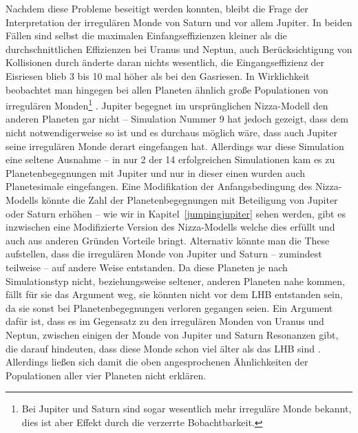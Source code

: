 \documentclass[12pt,a4paper,twoside,open=right,bibliography=totoc]{scrbook}
\renewcommand{\cite}{ \citep}
\begin{document}
Nachdem diese Probleme beseitigt werden konnten, bleibt die Frage der Interpretation der irregulären Monde von Saturn und vor allem Jupiter. In beiden Fällen sind selbst die maximalen Einfangseffizienzen kleiner als die durchschnittlichen Effizienzen bei Uranus und Neptun, auch Berücksichtigung von Kollisionen durch \cite{Bottke2010} änderte daran nichts wesentlich, die Eingangseffizienz der Eisriesen blieb 3 bis 10 mal höher als bei den Gasriesen.
In Wirklichkeit beobachtet man hingegen bei allen Planeten ähnlich große Populationen von irregulären Monden\footnote{Bei Jupiter und Saturn sind sogar wesentlich mehr irreguläre Monde bekannt, dies ist aber Effekt durch die verzerrte Bobachtbarkeit.}\cite{Nesvorny2007}. %
Jupiter begegnet im ursprünglichen Nizza-Modell den anderen Planeten gar nicht –
Simulation Nummer 9 hat jedoch gezeigt, dass dem nicht notwendigerweise so ist und es durchaus möglich wäre, dass auch Jupiter seine irregulären Monde derart eingefangen hat.
Allerdings war diese Simulation eine seltene Ausnahme – in nur 2 der 14 erfolgreichen Simulationen kam es zu Planetenbegegnungen mit Jupiter und nur in dieser einen wurden auch Planetesimale eingefangen.
Eine Modifikation der Anfangsbedingung des Nizza-Modells könnte die Zahl der Planetenbegegnungen mit Beteiligung von Jupiter oder Saturn erhöhen -- wie wir in Kapitel~\ref{jumpingjupiter} sehen werden, gibt es inzwischen eine Modifizierte Version des Nizza-Modells welche dies erfüllt und auch aus anderen Gründen Vorteile bringt.
Alternativ könnte man die These aufstellen, dass die irregulären Monde von Jupiter und Saturn – zumindest teilweise – auf andere Weise entstanden. Da diese Planeten je nach Simulationstyp nicht, beziehungsweise seltener, anderen Planeten nahe kommen, fällt für sie das Argument weg, sie könnten nicht vor dem LHB entstanden sein, da sie sonst bei Planetenbegegnungen verloren gegangen seien.
Ein Argument dafür ist, dass es im Gegensatz zu den irregulären Monden von Uranus und Neptun, zwischen einigen der Monde von Jupiter und Saturn Resonanzen gibt, die darauf hindeuten, dass diese Monde schon viel älter als das LHB sind\cite{Beauge2007,Nesvorny2007}.
Allerdings ließen sich damit die oben angesprochenen Ähnlichkeiten der Populationen aller vier Planeten nicht erklären.

\FloatBarrier
\end{document}
